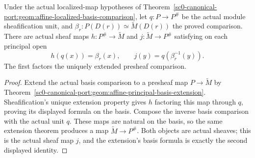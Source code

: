 \begin{theorem}
\label{sc0-canonical-port:geom:affine-localized-sheafification-maps}
\leanok
Under the actual localized-map hypotheses of
Theorem~\ref{sc0-canonical-port:geom:affine-localized-basis-comparison}, let
\(q:P\to P^\#\) be the actual module sheafification
unit, and \(\beta_r:P(D(r))\simeq\widetilde M(D(r))\)
the proved comparison. There are actual sheaf maps
\(h:P^\#\to\widetilde M\) and
\(j:\widetilde M\to P^\#\) satisfying on each
principal open
\[
 h(q(x))=\beta_r(x),\qquad
 j(y)=q(\beta_r^{-1}(y)).
\]
The first factors the uniquely extended presheaf comparison.
\end{theorem}
\begin{proof}
Extend the actual basis comparison to a presheaf map
\(P\to\widetilde M\) by
Theorem~\ref{sc0-canonical-port:geom:affine-principal-basis-extension}.
Sheafification's unique extension property gives
\(h\) factoring this map through \(q\), proving
its displayed formula on the basis.
Compose the inverse basis comparison with the actual
unit \(q\). These maps are natural on the basis,
so the same extension theorem produces a map
\(\widetilde M\to P^\#\). Both objects are actual
sheaves; this is the actual sheaf map \(j\), and
the extension's basis formula is exactly the second
displayed identity.
\end{proof}

